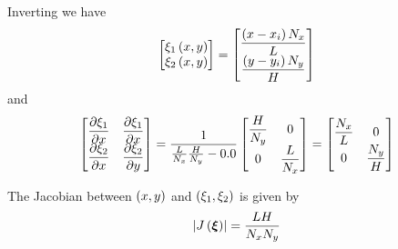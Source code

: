 Inverting we have
\begin{equation}
  \begin{bmatrix}
     \xi_{1}\left( x,y \right)  \\
     \xi_{2}\left( x,y \right) 
  \end{bmatrix} = \begin{bmatrix}
    \dfrac{\left( x-x_{i} \right)N_{x}}{L} \\
    \dfrac{\left( y-y_{i} \right)N_{y}}{H} 
  \end{bmatrix}
\end{equation}
and
\begin{equation}
  \begin{bmatrix}
     \dfrac{\partial \xi_{1}}{\partial x}  &  \dfrac{\partial \xi_{1}}{\partial x}  \\
     \dfrac{\partial \xi_{2}}{\partial x}  &  \dfrac{\partial \xi_{2}}{\partial y}          
  \end{bmatrix} = \dfrac{1}{\frac{L}{N_{x}}\frac{H}{N_{y}}-0.0} \begin{bmatrix}
    \dfrac{H}{N_{y}} & 0 \\
    0 & \dfrac{L}{N_{x}}
  \end{bmatrix} = \begin{bmatrix}
    \dfrac{N_{x}}{L} & 0 \\
    0 & \dfrac{N_{y}}{H}
  \end{bmatrix}
\end{equation}

The Jacobian between $\left( x,y \right)$ and $\left( \xi_{1},\xi_{2} \right)$ is given by
\begin{equation}
  \left|  J\left(  \boldsymbol{\xi}  \right)  \right|=\dfrac{LH}{N_{x}N_{y}}
\end{equation}

